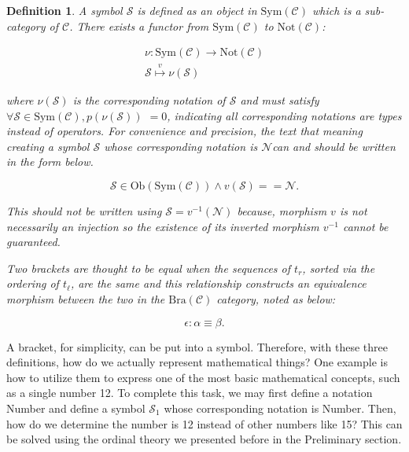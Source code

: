 \documentclass{aims}
\numberwithin{equation}{section}
\newtheorem{definition}{Definition}	%
\numberwithin{theorem}{section}	%
\numberwithin{axiom}{section}	%
\numberwithin{definition}{section}	%
\begin{document}
	\begin{definition}
		A{ symbol} \(\mathcal{S}\) is defined as an object in \(\text{Sym}(\mathcal{C})\) which is a sub-category of \(\mathcal{C}\). There exists a functor from \(\text{Sym}(\mathcal{C})\) to \(\text{Not}(\mathcal{C})\):
		
		\begin{equation}
			\begin{gathered}
				\nu :\text{Sym}(\mathcal{C})\to \text{Not}(\mathcal{C})\\
				\mathcal{S}\overset{\mathit{v}}{\mapsto }\nu (\mathcal{S})
			\end{gathered}
		\end{equation}
		
		\noindent where \(\nu (\mathcal{S})\) is the{ corresponding notation} of \(\mathcal{S}\) and must satisfy \(\forall \mathcal{S}\in \text{Sym}(\mathcal{C}),\mathit{p}(\nu (\mathcal{S}))\) \(= 0\), indicating all corresponding notations are types instead of operators. For convenience and precision, the text that meaning creating a symbol \(\mathcal{S}\) whose corresponding notation is \(\mathcal{N}\)can and should be written in the form below.
		
		\begin{equation}
			\mathcal{S}\in \text{Ob}(\text{Sym}(\mathcal{C}))\land \mathit{v}(\mathcal{S})==\mathcal{N}.
		\end{equation}
		
		This should not be written using \(\mathcal{S}=\mathit{v}^{-1}(\mathcal{N})\) because, morphism \(\mathit{v}\) is not necessarily an injection so the existence of its inverted morphism \(\mathit{v}^{-1}\) cannot be guaranteed.
		
		Two brackets are thought to be{ equal} when the sequences of \(t_{\mathit{r}}\), sorted via the ordering of \(t_{\ell }\), are the same and this relationship constructs an equivalence morphism between the two in the \(\text{Bra}(\mathcal{C})\) category, noted as below:
		
		\begin{equation}
			\epsilon :\alpha \equiv \beta.
		\end{equation}
	\end{definition}
	
	A bracket, for simplicity, can be put into a symbol. Therefore, with these three definitions, how do we actually represent mathematical things? One example is how to utilize them to express one of the most basic mathematical concepts, such as a single number 12. To complete this task, we may first define a notation Number and define a symbol \(\mathcal{S}_1\) whose corresponding notation is Number. Then, how do we determine the number is 12 instead of other numbers like 15? This can be solved using the ordinal theory we presented before in the Preliminary section.
	
\end{document}
